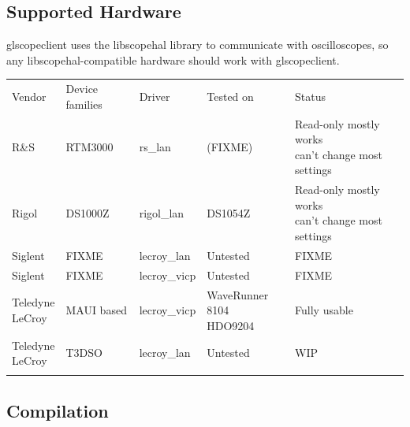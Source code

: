 \documentclass[11pt]{article}
\newcommand{\thickhline}{\Xhline{2.5\arrayrulewidth}}
\begin{document}
\subsection{Supported Hardware}

glscopeclient uses the libscopehal library to communicate with oscilloscopes, so any libscopehal-compatible hardware
should work with glscopeclient.

\begin{tabularx}{16cm}{lllllX}
\thickhline
Vendor & Device families & Driver & Tested on & Status \\
\thickhline
R\&S & RTM3000 & rs\_lan & (FIXME) & \makecell{Read-only mostly works\\can't change most settings} \\
\thickhline
Rigol & DS1000Z & rigol\_lan & DS1054Z & \makecell{Read-only mostly works\\can't change most settings} \\
\thickhline
Siglent & FIXME & lecroy\_lan & Untested & FIXME \\
\thickhline
Siglent & FIXME & lecroy\_vicp & Untested & FIXME \\
\thickhline
\makecell{Teledyne \\ LeCroy} & MAUI based & lecroy\_vicp & \makecell{WaveRunner 8104 \\ HDO9204} & Fully usable \\
\thickhline
\makecell{Teledyne \\ LeCroy} & T3DSO & lecroy\_lan & Untested & WIP \\
\thickhline
\end{tabularx}

\subsection{Compilation}
\end{document}
